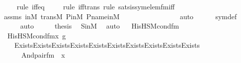 \begin{isabellebody}
\ \ \ \ \isamarkupfalse%
{\isacharparenleft}{\kern0pt}rule\ iff{\isacharunderscore}{\kern0pt}eq{\isacharparenright}{\kern0pt}\isanewline
\ \ \ \ \isamarkupfalse%
{\isacharparenleft}{\kern0pt}rule\ iff{\isacharunderscore}{\kern0pt}trans{\isacharcomma}{\kern0pt}\ rule\ sats{\isacharunderscore}{\kern0pt}is{\isacharunderscore}{\kern0pt}sym{\isacharunderscore}{\kern0pt}elem{\isacharunderscore}{\kern0pt}fm{\isacharunderscore}{\kern0pt}iff{\isacharparenright}{\kern0pt}\isanewline
\ \ \ \ \isamarkupfalse%
\ assms\ {\isasymG}{\isacharunderscore}{\kern0pt}in{\isacharunderscore}{\kern0pt}M\ transM\ P{\isacharunderscore}{\kern0pt}in{\isacharunderscore}{\kern0pt}M\ P{\isacharunderscore}{\kern0pt}name{\isacharunderscore}{\kern0pt}in{\isacharunderscore}{\kern0pt}M\ \isanewline
\ \ \ \ \ \ \ \ \ \ \ \ \ \ \isamarkupfalse%
\ auto{\isacharbrackleft}{\kern0pt}{}{}{\isacharbrackright}{\kern0pt}\isanewline
\ \ \ \ \isamarkupfalse%
\ sym{\isacharunderscore}{\kern0pt}def\ \isanewline
\ \ \ \ \isamarkupfalse%
\ auto\isanewline
\ \ \isamarkupfalse%
\ \isamarkupfalse%
\ {\isacharquery}{\kern0pt}thesis\ \isamarkupfalse%
\ SinM\ \isamarkupfalse%
\ auto\isanewline
{}\isamarkupfalse%
%
\endisatagproof
{\isafoldproof}%
%
\isadelimproof
\isanewline
%
\endisadelimproof
\isanewline
{}\isamarkupfalse%
\isanewline
\isanewline
\ \isanewline
\isanewline
{}\isamarkupfalse%
\ His{\isacharunderscore}{\kern0pt}HS{\isacharunderscore}{\kern0pt}M{\isacharunderscore}{\kern0pt}cond{\isacharunderscore}{\kern0pt}fm\ \ \isanewline
\ \ {\isachardoublequoteopen}His{\isacharunderscore}{\kern0pt}HS{\isacharunderscore}{\kern0pt}M{\isacharunderscore}{\kern0pt}cond{\isacharunderscore}{\kern0pt}fm{\isacharparenleft}{\kern0pt}x{\isacharprime}{\kern0pt}{\isacharcomma}{\kern0pt}\ g{\isacharparenright}{\kern0pt}\ {\isasymequiv}\ \isanewline
\ \ \ \ Exists{\isacharparenleft}{\kern0pt}Exists{\isacharparenleft}{\kern0pt}Exists{\isacharparenleft}{\kern0pt}Exists{\isacharparenleft}{\kern0pt}Exists{\isacharparenleft}{\kern0pt}Exists{\isacharparenleft}{\kern0pt}Exists{\isacharparenleft}{\kern0pt}Exists{\isacharparenleft}{\kern0pt}Exists{\isacharparenleft}{\kern0pt}Exists{\isacharparenleft}{\kern0pt}\isanewline
\ \ \ \ \ \ And{\isacharparenleft}{\kern0pt}pair{\isacharunderscore}{\kern0pt}fm{\isacharparenleft}{\kern0pt}{}{\isacharcomma}{\kern0pt}\ {}{\isacharcomma}{\kern0pt}\ x{\isacharprime}{\kern0pt}\ {\isacharhash}{\kern0pt}{\isacharplus}{\kern0pt}\ {}{}{\isacharparenright}{\kern0pt}{\isacharcomma}{\kern0pt}\ \isanewline

\end{isabellebody}
